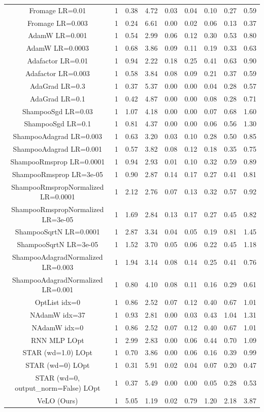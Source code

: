 \begin{tabular}{||c c c c c c c c c||}
Fromage LR=0.01 & 1 &0.38 & 4.72 & 0.03 & 0.04 & 0.10 & 0.27 & 0.59 \\
Fromage LR=0.003 & 1 &0.24 & 6.61 & 0.00 & 0.02 & 0.06 & 0.13 & 0.37 \\
AdamW LR=0.001 & 1 &0.54 & 2.99 & 0.06 & 0.12 & 0.30 & 0.53 & 0.80 \\
AdamW LR=0.0003 & 1 &0.68 & 3.86 & 0.09 & 0.11 & 0.19 & 0.33 & 0.63 \\
Adafactor LR=0.01 & 1 &0.94 & 2.22 & 0.18 & 0.25 & 0.41 & 0.63 & 0.90 \\
Adafactor LR=0.003 & 1 &0.58 & 3.84 & 0.08 & 0.09 & 0.21 & 0.37 & 0.59 \\
AdaGrad LR=0.3 & 1 &0.37 & 5.37 & 0.00 & 0.00 & 0.04 & 0.28 & 0.57 \\
AdaGrad LR=0.1 & 1 &0.42 & 4.87 & 0.00 & 0.00 & 0.08 & 0.28 & 0.71 \\
ShampooSgd LR=0.03 & 1 &1.07 & 4.18 & 0.00 & 0.00 & 0.07 & 0.68 & 1.60 \\
ShampooSgd LR=0.1 & 1 &0.81 & 4.37 & 0.00 & 0.00 & 0.06 & 0.56 & 1.30 \\
ShampooAdagrad LR=0.003 & 1 &0.63 & 3.20 & 0.03 & 0.10 & 0.28 & 0.50 & 0.85 \\
ShampooAdagrad LR=0.001 & 1 &0.57 & 3.82 & 0.08 & 0.12 & 0.18 & 0.35 & 0.75 \\
ShampooRmsprop LR=0.0001 & 1 &0.94 & 2.93 & 0.01 & 0.10 & 0.32 & 0.59 & 0.89 \\
ShampooRmsprop LR=3e-05 & 1 &0.90 & 2.87 & 0.14 & 0.17 & 0.27 & 0.41 & 0.81 \\
ShampooRmspropNormalized LR=0.0001 & 1 &2.12 & 2.76 & 0.07 & 0.13 & 0.32 & 0.57 & 0.92 \\
ShampooRmspropNormalized LR=3e-05 & 1 &1.69 & 2.84 & 0.13 & 0.17 & 0.27 & 0.45 & 0.82 \\
ShampooSqrtN LR=0.0001 & 1 &2.87 & 3.34 & 0.04 & 0.05 & 0.19 & 0.81 & 1.45 \\
ShampooSqrtN LR=3e-05 & 1 &1.52 & 3.70 & 0.05 & 0.06 & 0.22 & 0.45 & 1.18 \\
ShampooAdagradNormalized LR=0.003 & 1 &1.94 & 3.14 & 0.08 & 0.14 & 0.25 & 0.41 & 0.76 \\
ShampooAdagradNormalized LR=0.001 & 1 &0.80 & 4.10 & 0.08 & 0.11 & 0.16 & 0.29 & 0.61 \\
\hline
OptList idx=0 & 1 &0.86 & 2.52 & 0.07 & 0.12 & 0.40 & 0.67 & 1.01 \\
NAdamW idx=37 & 1 &0.93 & 2.81 & 0.00 & 0.03 & 0.43 & 1.04 & 1.31 \\
NAdamW idx=0 & 1 &0.86 & 2.52 & 0.07 & 0.12 & 0.40 & 0.67 & 1.01 \\
\hline
RNN MLP LOpt & 1 &2.99 & 2.83 & 0.00 & 0.06 & 0.44 & 0.70 & 1.09 \\
STAR (wd=1.0) LOpt & 1 &0.70 & 3.86 & 0.00 & 0.06 & 0.16 & 0.39 & 0.99 \\
STAR (wd=0) LOpt & 1 &0.31 & 5.91 & 0.02 & 0.04 & 0.07 & 0.20 & 0.47 \\
STAR (wd=0, output\_norm=False) LOpt & 1 &0.37 & 5.49 & 0.00 & 0.00 & 0.05 & 0.28 & 0.53 \\
\hline
VeLO (Ours) & 1 &5.05 & 1.19 & 0.02 & 0.79 & 1.20 & 2.18 & 3.87 \\

        \hline
\end{tabular}